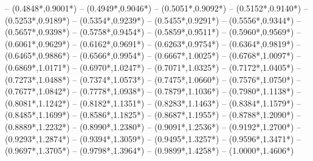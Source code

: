 {	-- ({0.4848*\dx},{0.9001*\dy}) %
	-- ({0.4949*\dx},{0.9046*\dy}) %
	-- ({0.5051*\dx},{0.9092*\dy}) %
	-- ({0.5152*\dx},{0.9140*\dy}) %
	-- ({0.5253*\dx},{0.9189*\dy}) %
	-- ({0.5354*\dx},{0.9239*\dy}) %
	-- ({0.5455*\dx},{0.9291*\dy}) %
	-- ({0.5556*\dx},{0.9344*\dy}) %
	-- ({0.5657*\dx},{0.9398*\dy}) %
	-- ({0.5758*\dx},{0.9454*\dy}) %
	-- ({0.5859*\dx},{0.9511*\dy}) %
	-- ({0.5960*\dx},{0.9569*\dy}) %
	-- ({0.6061*\dx},{0.9629*\dy}) %
	-- ({0.6162*\dx},{0.9691*\dy}) %
	-- ({0.6263*\dx},{0.9754*\dy}) %
	-- ({0.6364*\dx},{0.9819*\dy}) %
	-- ({0.6465*\dx},{0.9886*\dy}) %
	-- ({0.6566*\dx},{0.9954*\dy}) %
	-- ({0.6667*\dx},{1.0025*\dy}) %
	-- ({0.6768*\dx},{1.0097*\dy}) %
	-- ({0.6869*\dx},{1.0171*\dy}) %
	-- ({0.6970*\dx},{1.0247*\dy}) %
	-- ({0.7071*\dx},{1.0325*\dy}) %
	-- ({0.7172*\dx},{1.0405*\dy}) %
	-- ({0.7273*\dx},{1.0488*\dy}) %
	-- ({0.7374*\dx},{1.0573*\dy}) %
	-- ({0.7475*\dx},{1.0660*\dy}) %
	-- ({0.7576*\dx},{1.0750*\dy}) %
	-- ({0.7677*\dx},{1.0842*\dy}) %
	-- ({0.7778*\dx},{1.0938*\dy}) %
	-- ({0.7879*\dx},{1.1036*\dy}) %
	-- ({0.7980*\dx},{1.1138*\dy}) %
	-- ({0.8081*\dx},{1.1242*\dy}) %
	-- ({0.8182*\dx},{1.1351*\dy}) %
	-- ({0.8283*\dx},{1.1463*\dy}) %
	-- ({0.8384*\dx},{1.1579*\dy}) %
	-- ({0.8485*\dx},{1.1699*\dy}) %
	-- ({0.8586*\dx},{1.1825*\dy}) %
	-- ({0.8687*\dx},{1.1955*\dy}) %
	-- ({0.8788*\dx},{1.2090*\dy}) %
	-- ({0.8889*\dx},{1.2232*\dy}) %
	-- ({0.8990*\dx},{1.2380*\dy}) %
	-- ({0.9091*\dx},{1.2536*\dy}) %
	-- ({0.9192*\dx},{1.2700*\dy}) %
	-- ({0.9293*\dx},{1.2874*\dy}) %
	-- ({0.9394*\dx},{1.3059*\dy}) %
	-- ({0.9495*\dx},{1.3257*\dy}) %
	-- ({0.9596*\dx},{1.3471*\dy}) %
	-- ({0.9697*\dx},{1.3705*\dy}) %
	-- ({0.9798*\dx},{1.3964*\dy}) %
	-- ({0.9899*\dx},{1.4258*\dy}) %
	-- ({1.0000*\dx},{1.4606*\dy}) %
}
\def\hzero{0.54773}
